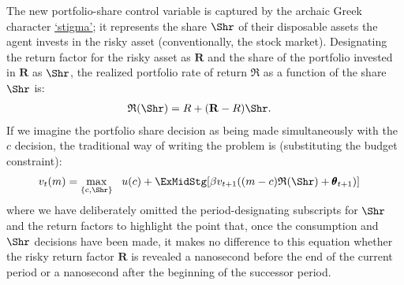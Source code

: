 \documentclass[titlepage, headings=optiontotocandhead]{Resources/texmf-local/tex/latex/econtex}
\begin{document}
The new portfolio-share control variable is captured by the archaic Greek character \href{https://en.wikipedia.org/wiki/Stigma_(ligature)}{`stigma'}; it represents the share $\Shr$ of their disposable assets the agent invests in the risky asset (conventionally, the stock market).  Designating the return factor for the risky asset as ${\mathbf{R}}$ and the share of the portfolio invested in ${\mathbf{R}}$ as $\Shr$, the realized portfolio rate of return $\mathfrak{R}$ as a function of the share $\Shr$ is:
\begin{equation}\begin{gathered}\begin{aligned}
      \mathfrak{R}(\Shr) &= R+({\mathbf{R}}-R)\Shr \label{eq:Shr}.
    \end{aligned}\end{gathered}\end{equation}
If we imagine the portfolio share decision as being made simultaneously with the $c$ decision, the traditional way of writing the problem is (substituting the budget constraint):
\begin{equation}\begin{gathered}\begin{aligned}
      v_{t}(m)  & = \max_{\{\mathrm{c},\Shr\}} ~~  u(c) + \ExMidStg[\beta v_{t+1}((m-c)\mathfrak{R}(\Shr) + {\pmb{\theta}}_{t+1})] \label{eq:Bellmanundated}
    \end{aligned}\end{gathered}\end{equation}
where we have deliberately omitted the {period}-designating subscripts for $\Shr$ and the return factors to highlight the point that, once the consumption and $\Shr$ decisions have been made, it makes no difference to this equation whether the risky return factor ${\mathbf{R}}$ is revealed a nanosecond before the end of the current {period} or a nanosecond after the beginning of the successor {period}.
\end{document}
